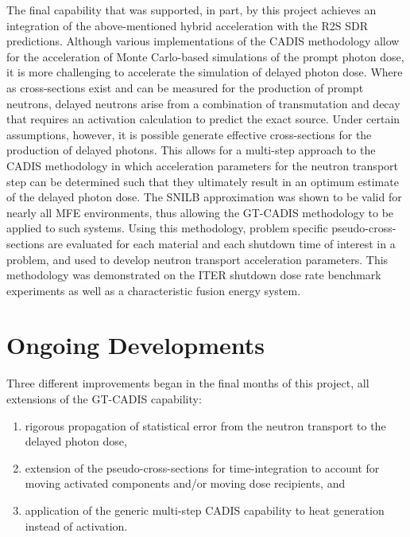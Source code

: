 The final capability that was supported, in part, by this project achieves an
integration of the above-mentioned hybrid acceleration with the \gls{R2S}
\gls{SDR} predictions.  Although various implementations of the \gls{CADIS}
methodology allow for the acceleration of Monte Carlo-based simulations of the
prompt photon dose, it is more challenging to accelerate the simulation of
delayed photon dose.  Where as cross-sections exist and can be measured for
the production of prompt neutrons, delayed neutrons arise from a combination
of transmutation and decay that requires an activation calculation to predict
the exact source.  Under certain assumptions, however, it is possible generate
effective cross-sections for the production of delayed photons.  This allows
for a multi-step approach to the \gls{CADIS} methodology in which acceleration
parameters for the neutron transport step can be determined such that they
ultimately result in an optimum estimate of the delayed photon dose.  The
\gls{SNILB} approximation was shown to be valid for nearly all \gls{MFE}
environments, thus allowing the \gls{GT-CADIS} methodology to be applied to
such systems.  Using this methodology, problem specific pseudo-cross-sections
are evaluated for each material and each shutdown time of interest in a
problem, and used to develop neutron transport acceleration parameters.  This
methodology was demonstrated on the ITER shutdown dose rate benchmark
experiments as well as a characteristic fusion energy
system.

\section{Ongoing Developments}

Three different improvements began in the final months of this project, all
extensions of the \gls{GT-CADIS} capability:
\begin{enumerate}
\item rigorous propagation of statistical error from the neutron transport to
  the delayed photon dose,
\item extension of the pseudo-cross-sections for time-integration to account
  for moving activated components and/or moving dose recipients, and
\item application of the generic multi-step \gls{CADIS} capability to heat
  generation instead of activation.
\end{enumerate} 
